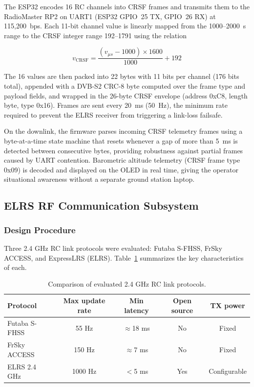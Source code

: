 The ESP32 encodes 16 RC channels into CRSF frames and transmits them to the RadioMaster RP2
on UART1 (ESP32 GPIO~25 TX, GPIO~26 RX) at 115,200~bps.
Each 11-bit channel value is linearly mapped from the 1000--2000~\textmu s range to the CRSF
integer range 192--1791 using the relation

\begin{equation}
    v_{\text{CRSF}} = \frac{(v_{\mu s} - 1000) \times 1600}{1000} + 192
\end{equation}

The 16 values are then packed into 22 bytes with 11 bits per channel (176 bits total), appended
with a DVB-S2 CRC-8 byte computed over the frame type and payload fields, and wrapped in the
26-byte CRSF envelope (address 0xC8, length byte, type 0x16).
Frames are sent every 20~ms (50~Hz), the minimum rate required to prevent the ELRS receiver
from triggering a link-loss failsafe.

On the downlink, the firmware parses incoming CRSF telemetry frames using a byte-at-a-time
state machine that resets whenever a gap of more than 5~ms is detected between consecutive
bytes, providing robustness against partial frames caused by UART contention.
Barometric altitude telemetry (CRSF frame type 0x09) is decoded and displayed on the OLED
in real time, giving the operator situational awareness without a separate ground station laptop.

\subsection{ELRS RF Communication Subsystem}
\label{subsec:elrs}

\subsubsection{Design Procedure}

Three 2.4 GHz RC link protocols were evaluated: Futaba S-FHSS, FrSky ACCESS, and
ExpressLRS (ELRS).
Table~\ref{tab:rf-comparison} summarizes the key characteristics of each.

\begin{table}[htb!]
    \centering
    \caption{Comparison of evaluated 2.4 GHz RC link protocols.}
    \label{tab:rf-comparison}
    \begin{tabularx}{\linewidth}{l c c c c}
        \hline
        \textbf{Protocol} & \textbf{Max update rate} & \textbf{Min latency} &
            \textbf{Open source} & \textbf{TX power} \\
        \hline
        Futaba S-FHSS  & 55 Hz    & $\approx$18 ms & No  & Fixed      \\
        FrSky ACCESS   & 150 Hz   & $\approx$7 ms  & No  & Fixed      \\
        ELRS 2.4 GHz   & 1000 Hz  & $<$5 ms        & Yes & Configurable \\
        \hline
    \end{tabularx}
\end{table}

